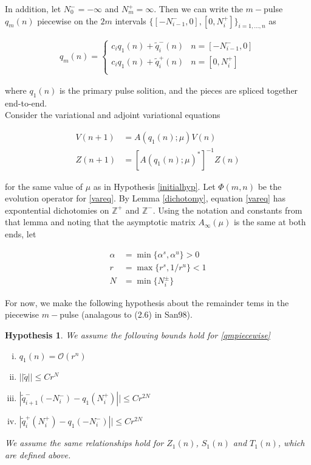 \documentclass[12pt]{article}
\def\Z{{\mathbb Z}}
\newtheorem{hypothesis}{Hypothesis}
\begin{document}
In addition, let $N_0^- = -\infty$ and $N_m^+ = \infty$. Then we can write the $m-$pulse $q_m(n)$ piecewise on the $2m$ intervals $\{ [-N_{i-1}^-, 0], [0, N_i^+] \}_{i=1, \dots, n}$ as

\begin{align}\label{qmpiecewise}
q_m(n) =
\begin{cases}
c_i q_1(n) + \tilde{q}_i^-(n) & n = [-N_{i-1}^-, 0] \\
c_i q_1(n) + \tilde{q}_i^+(n) & n = [0, N_i^+] \\
\end{cases}
\end{align}

where $q_1(n)$ is the primary pulse solition, and the pieces are spliced together end-to-end.\\

Consider the variational and adjoint variational equations

\begin{align}
V(n+1) &= A(q_1(n); \mu) V(n) \label{vareq} \\
Z(n+1) &= [A(q_1(n); \mu)^*]^{-1} Z(n) \label{adjvareq}
\end{align}

for the same value of $\mu$ as in Hypothesis \ref{initialhyp}. Let $\Phi(m, n)$ be the evolution operator for \eqref{vareq}. By Lemma \ref{dichotomy}, equation \eqref{vareq} has expontential dichotomies on $\Z^+$ and $\Z^-$. Using the notation and constants from that lemma and noting that the asymptotic matrix $A_\infty(\mu)$ is the same at both ends, let

\begin{align*}
\alpha &= \min \{ \alpha^s, \alpha^u \} > 0 \\
r &= \max \{ r^s, 1/r^u \} < 1 \\
N &= \min \{ N_i^\pm \}
\end{align*}

For now, we make the following hypothesis about the remainder tems in the piecewise $m-$pulse (analagous to (2.6) in San98).

\begin{hypothesis}\label{qbounds}We assume the following bounds hold for \eqref{qmpiecewise}
\begin{enumerate}[(i)]
\item $q_1(n) = \mathcal{O}(r^n)$
\item $||\tilde{q}|| \leq C r^N$
\item $|\tilde{q}_{i+1}^-(-N_i^-) - q_1(N_i^+)|| \leq C r^{2N}$ 
\item $|\tilde{q}_i^+(N_i^+) - q_1(-N_i^-)|| \leq C r^{2N}$
\end{enumerate}
We assume the same relationships hold for $Z_1(n)$, $S_1(n)$ and $T_1(n)$, which are defined above.
\end{hypothesis}
\end{document}
